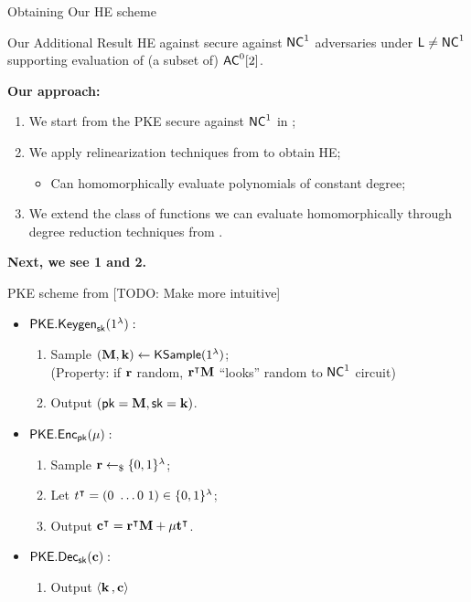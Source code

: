\begin{frame}[t]{Obtaining Our HE scheme}
\begin{block}{Our Additional Result}
	HE against secure against ${\mathsf{NC}}^1$ adversaries under ${\mathsf{L}} \not = {\mathsf{NC}}^1$ supporting evaluation of (a subset of) ${\mathsf{AC}}^0[2]$.
\end{block}
\pause
\bigskip
	\textbf{Our approach:}
	\begin{enumerate}[<+- | alert@+>]
		\item We start from the PKE secure against ${\mathsf{NC}}^1$ in \cite{fgcrypto};
		\item We apply relinearization techniques from \cite{fhe-lwe} to obtain HE;
		\begin{itemize}
			\item Can homomorphically evaluate polynomials of constant degree; 
		\end{itemize}
		\item We extend the class of functions we can evaluate homomorphically through degree reduction techniques from \cite{razborov1987lower}.
	\end{enumerate}\pause
	\textbf{Next, we see 1 and 2.}
\end{frame}

\begin{frame}{PKE scheme from \cite{fgcrypto}}
	[TODO: Make more intuitive]
	\begin{itemize}
		\item $\mathsf{PKE.Keygen}_{\mathsf{sk}}(1^{\lambda}):$
		\begin{enumerate}
			\item Sample $(\mathbf{M}, \mathbf{k}) \gets \mathsf{KSample}(1^{\lambda})$;\\
			 {\color{red}(Property: if $\mathbf{r}$ random, ${\mathbf{r}}^{\intercal}  \mathbf{M}$ ``looks'' random to ${\mathsf{NC}}^1$ circuit)}
			\item Output $(\mathsf{pk} = \mathbf{M}, \mathsf{sk} = \mathbf{k})$.
		\end{enumerate}
		\pause
		\item $\mathsf{PKE.Enc}_{\mathsf{pk}}(\mu):$
		\begin{enumerate}
			\item Sample $\mathbf{r} \leftarrow_{\$} \{0, 1\}^{\lambda}$;
			\item Let ${t}^{\intercal} = (0 \ \dots 0 \ 1) \in \{0, 1\}^{\lambda}$;
			\item Output ${\mathbf{c}}^{\intercal} = {\mathbf{r}}^{\intercal}  \mathbf{M} + \mu{\mathbf{t}}^{\intercal}$.
		\end{enumerate}
		\pause
		\item $\mathsf{PKE.Dec}_{\mathsf{sk}}(\mathbf{c}):$
		\begin{enumerate}
			\item Output $\langle \mathbf{k} \, , \mathbf{c} \rangle$
		\end{enumerate}
		
	\end{itemize}
\end{frame}

